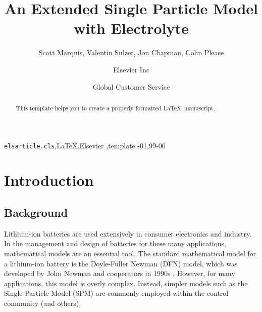 \documentclass[preprint]{elsarticle}
\begin{document}
\begin{frontmatter}


\title{An Extended Single Particle Model with Electrolyte}

\author{Scott Marquis, Valentin Sulzer, Jon Chapman, Colin Please}
\address{University of Oxford}

\author[mymainaddress,mysecondaryaddress]{Elsevier Inc}

\author[mysecondaryaddress]{Global Customer Service}

\address[mymainaddress]{1600 John F Kennedy Boulevard, Philadelphia}
\address[mysecondaryaddress]{360 Park Avenue South, New York}

\begin{abstract}
This template helps you to create a properly formatted \LaTeX\ manuscript.
\end{abstract}

\begin{keyword}
\texttt{elsarticle.cls}\sep \LaTeX\sep Elsevier \sep template
-01\sep  99-00
\end{keyword}

\end{frontmatter}

\linenumbers

\section{Introduction} 
\subsection{Background}
Lithium-ion batteries are used extensively in consumer electronics and industry. In the management and design of batteries for these many applications, mathematical models are an essential tool. The standard mathematical model for a lithium-ion battery is the Doyle-Fuller Newman (DFN) model, which was developed by John Newman and cooperators in 1990s \cite{doyle,Fuller1994,newman_book}. However, for many applications, this model is overly complex. Instead, simpler models such as the Single Particle Model (SPM) are commonly employed within the control community \cite{Moura2017} (and others). \\
\end{document}
